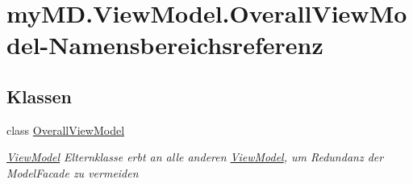 \hypertarget{namespacemy_m_d_1_1_view_model_1_1_overall_view_model}{}\section{my\+M\+D.\+View\+Model.\+Overall\+View\+Model-\/\+Namensbereichsreferenz}
\label{namespacemy_m_d_1_1_view_model_1_1_overall_view_model}
\subsection*{Klassen}
\begin{DoxyCompactItemize}
\item 
class \mbox{\hyperlink{classmy_m_d_1_1_view_model_1_1_overall_view_model_1_1_overall_view_model}{Overall\+View\+Model}}
\begin{DoxyCompactList}\small\item\em \mbox{\hyperlink{namespacemy_m_d_1_1_view_model}{View\+Model}} Elternklasse erbt an alle anderen \mbox{\hyperlink{namespacemy_m_d_1_1_view_model}{View\+Model}}, um Redundanz der Model\+Facade zu vermeiden \end{DoxyCompactList}\end{DoxyCompactItemize}
